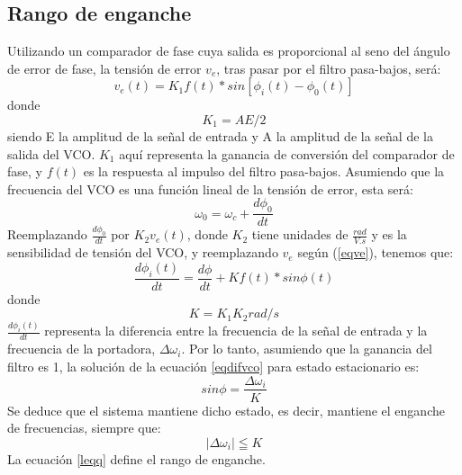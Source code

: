 \subsection{Rango de enganche}
Utilizando un comparador de fase cuya salida es proporcional al seno del ángulo de error de fase, la tensión de error $v_{e}$, tras pasar por el filtro pasa-bajos, será:
\begin{equation}\label{eqve}
    v_{e}(t)=K_{1}f(t)\ast sin[\phi_{i}(t)-\phi_{0}(t)]
\end{equation}
donde
\begin{equation*}
    K_{1}=AE/2
\end{equation*}
siendo E la amplitud de la señal de entrada y A la amplitud de la señal de la salida del VCO. $K_{1}$ aquí representa la ganancia de conversión del comparador de fase, y $f(t)$ es la respuesta al impulso del filtro pasa-bajos.
Asumiendo que la frecuencia del VCO es una función lineal de la tensión de error, esta será:
\begin{equation}
    \omega_{0}=\omega_{c}+\frac{d\phi_{0}}{dt}
\end{equation}
Reemplazando $\frac{d\phi_{0}}{dt}$ por $K_{2}v_{e}(t)$, donde $K_{2}$ tiene unidades de $\frac{rad}{V.s}$ y es la sensibilidad de tensión del VCO, y reemplazando $v_{e}$ según (\ref{eqve}), tenemos que:
\begin{equation}\label{eqdifvco}
    \frac{d\phi_{i}(t)}{dt}=\frac{d\phi}{dt}+Kf(t)\ast sin \phi(t)
\end{equation}
donde
\begin{equation*}
    K=K_{1}K_{2} rad/s
\end{equation*}
$\frac{d\phi_{i}(t)}{dt}$ representa la diferencia entre la frecuencia de la señal de entrada y la frecuencia de la portadora, $\Delta\omega_{i}$. Por lo tanto, asumiendo que la ganancia del filtro es 1, la solución de la ecuación \ref{eqdifvco} para estado estacionario es:
\begin{equation}\label{eqseno}
    sin\phi=\frac{\Delta\omega_{i}}{K}
\end{equation}
Se deduce que el sistema mantiene dicho estado, es decir, mantiene el enganche de frecuencias, siempre que:
\begin{equation}\label{leqq}
    |\Delta\omega_{i}| \leqq K
\end{equation}
La ecuación \ref{leqq} define el rango de enganche.
